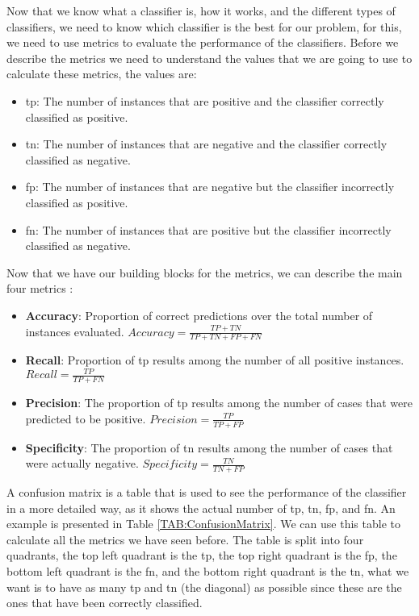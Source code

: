 Now that we know what a classifier is, how it works, and the different types of classifiers, we need to know which classifier is the best for our problem, for this, we need to use metrics to evaluate the performance of the classifiers. Before we describe the metrics we need to understand the values that we are going to use to calculate these metrics, the values are:


\begin{itemize}
    \item \ac{tp}: The number of instances that are positive and the classifier correctly classified as positive.
    \item \ac{tn}: The number of instances that are negative and the classifier correctly classified as negative.
    \item \ac{fp}: The number of instances that are negative but the classifier incorrectly classified as positive.
    \item \ac{fn}: The number of instances that are positive but the classifier incorrectly classified as negative.
\end{itemize}

Now that we have our building blocks for the metrics, we can describe the main four metrics \cite{m_review_2015}:

\begin{itemize}
    \item \textbf{Accuracy}: Proportion of correct predictions over the total number of instances evaluated. $Accuracy = \frac{TP + TN}{TP + TN + FP + FN}$
    \item \textbf{Recall}: Proportion of \ac{tp} results among the number of all positive instances. $Recall = \frac{TP}{TP + FN}$
    \item \textbf{Precision}: The proportion of \ac{tp} results among the number of cases that were predicted to be positive. $Precision = \frac{TP}{TP + FP}$
    \item \textbf{Specificity}: The proportion of \ac{tn} results among the number of cases that were actually negative. $Specificity = \frac{TN}{TN + FP}$
\end{itemize}

A confusion matrix is a table that is used to see the performance of the classifier in a more detailed way, as it shows the actual number of \ac{tp}, \ac{tn}, \ac{fp}, and \ac{fn}. An example is presented in Table \ref{TAB:ConfusionMatrix}. We can use this table to calculate all the metrics we have seen before. The table is split into four quadrants, the top left quadrant is the \ac{tp}, the top right quadrant is the \ac{fp}, the bottom left quadrant is the \ac{fn}, and the bottom right quadrant is the \ac{tn}, what we want is to have as many \ac{tp} and \ac{tn} (the diagonal) as possible since these are the ones that have been correctly classified.

